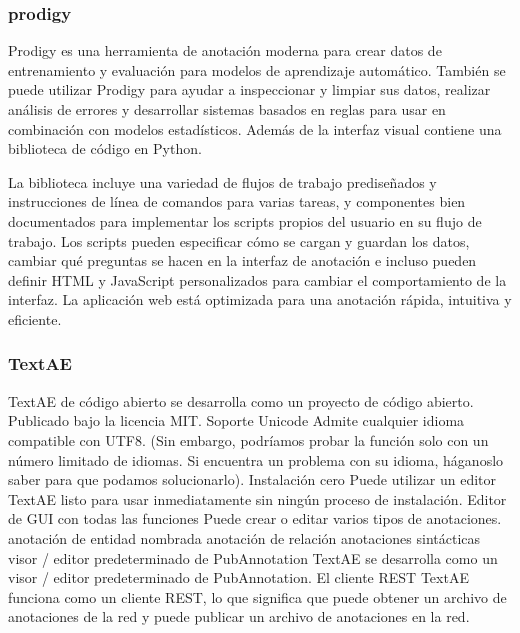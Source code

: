 \subsubsection*{prodigy}

Prodigy es una herramienta de anotación moderna para crear datos de entrenamiento y evaluación para modelos de aprendizaje automático. 
También se puede utilizar Prodigy para ayudar a inspeccionar y limpiar sus datos, realizar análisis de errores y desarrollar sistemas basados en reglas para usar en combinación con modelos estadísticos.
Además de la interfaz visual contiene una biblioteca de código en Python.

La biblioteca incluye una variedad de flujos de trabajo prediseñados y instrucciones de línea de comandos para varias tareas, y componentes bien documentados para implementar los scripts propios del usuario en su flujo de trabajo. 
Los scripts pueden especificar cómo se cargan y guardan los datos, cambiar qué preguntas se hacen en la interfaz de anotación e incluso pueden definir HTML y JavaScript personalizados para cambiar el comportamiento de la interfaz. 
La aplicación web está optimizada para una anotación rápida, intuitiva y eficiente.


\subsubsection*{TextAE}

TextAE de código abierto se desarrolla como un proyecto de código abierto. Publicado bajo la licencia MIT. Soporte Unicode Admite cualquier idioma compatible con UTF8. (Sin embargo, podríamos probar la función solo con un número limitado de idiomas. Si encuentra un problema con su idioma, háganoslo saber para que podamos solucionarlo). Instalación cero
Puede utilizar un editor TextAE listo para usar inmediatamente sin ningún proceso de instalación.
Editor de GUI con todas las funciones
Puede crear o editar varios tipos de anotaciones. anotación de entidad nombrada anotación de relación anotaciones sintácticas visor / editor predeterminado de PubAnnotation TextAE se desarrolla como un visor / editor predeterminado de PubAnnotation.
El cliente REST TextAE funciona como un cliente REST, lo que significa que puede obtener un archivo de anotaciones de la red y puede publicar un archivo de anotaciones en la red.

